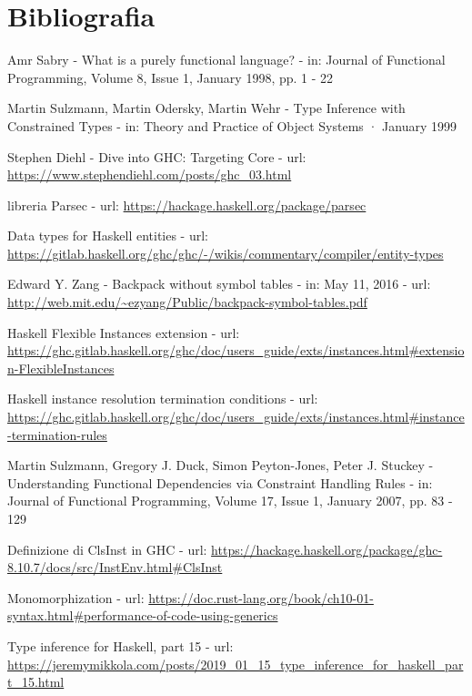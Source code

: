 \documentclass[10pt,a4paper]{article}
\begin{document}
\section*{Bibliografia}
\begin{enumerate}[label={[\arabic*]}]
    \item Amr Sabry - What is a purely functional language? - in: Journal of Functional Programming, Volume 8, Issue 1,
    January 1998, pp. 1 - 22
    \item Martin Sulzmann, Martin Odersky, Martin Wehr - Type Inference with Constrained Types - in: Theory and Practice
    of Object Systems · January 1999
    \item Stephen Diehl - Dive into GHC: Targeting Core - url: \url{https://www.stephendiehl.com/posts/ghc_03.html}
    \item libreria Parsec - url: \url{https://hackage.haskell.org/package/parsec}
    \item Data types for Haskell entities - url:
    \url{https://gitlab.haskell.org/ghc/ghc/-/wikis/commentary/compiler/entity-types}
    \item Edward Y. Zang - Backpack without symbol tables - in: May 11, 2016 - url:
    \url{http://web.mit.edu/~ezyang/Public/backpack-symbol-tables.pdf}
    \item Haskell Flexible Instances extension - url:
    \url{https://ghc.gitlab.haskell.org/ghc/doc/users_guide/exts/instances.html#extension-FlexibleInstances}
    \item Haskell instance resolution termination conditions - url:
    \url{https://ghc.gitlab.haskell.org/ghc/doc/users_guide/exts/instances.html#instance-termination-rules}
    \item Martin Sulzmann, Gregory J. Duck, Simon Peyton-Jones, Peter J. Stuckey - Understanding Functional Dependencies
    via Constraint Handling Rules - in: Journal of Functional Programming, Volume 17, Issue 1, January 2007, pp. 83 - 129
    \item Definizione di ClsInst in GHC - url: \url{https://hackage.haskell.org/package/ghc-8.10.7/docs/src/InstEnv.html#ClsInst}
    \item Monomorphization - url: \url{https://doc.rust-lang.org/book/ch10-01-syntax.html#performance-of-code-using-generics}
    \item Type inference for Haskell, part 15 - url: \url{https://jeremymikkola.com/posts/2019_01_15_type_inference_for_haskell_part_15.html}
\end{enumerate}
\end{document}
